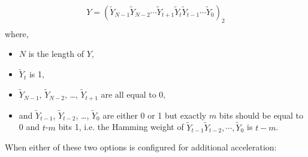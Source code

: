 \documentclass[main\_\_EN.tex]{subfiles}
\begin{document}
\begin{gather*}
Y = ( \widetilde{Y}_{N-1} \widetilde{Y}_{N-2} \cdots \widetilde{Y}_{t+1} \widetilde{Y}_{t} \widetilde{Y}_{t-1} \cdots \widetilde{Y}_{0} )_{2} \\
\end{gather*}
where,
\begin{itemize}
    \item \begin{math} N \end{math} is the length of \begin{math}Y \end{math},
    \item \begin{math}\widetilde{Y}_{t}\end{math} is 1,
    \item \begin{math}\widetilde{Y}_{N-1}\end{math}, \begin{math}\widetilde{Y}_{N-2}\end{math}, \dots, \begin{math}\widetilde{Y}_{t+1}\end{math} are all equal to 0,
    \item and \begin{math}\widetilde{Y}_{t-1}\end{math}, \begin{math}\widetilde{Y}_{t-2}\end{math}, \dots, \begin{math}\widetilde{Y}_{0}\end{math} are either 0 or 1 but exactly \begin{math}m\end{math} bits should be equal to 0 and \begin{math}t\end{math}-\begin{math}m\end{math} bits 1, i.e. the Hamming weight of \begin{math}\widetilde{Y}_{t-1} \widetilde{Y}_{t-2}, \cdots, \widetilde{Y}_{0}\end{math} is \begin{math}t -m\end{math}.
\end{itemize}

When either of these two options is configured for additional acceleration:
\end{document}
